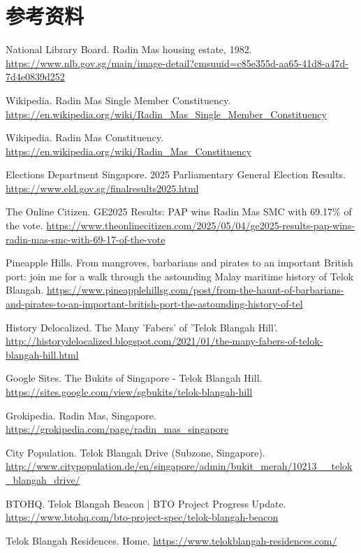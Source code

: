 \documentclass[11pt,a4paper,twoside,openany]{book}
\begin{document}
\section*{参考资料}
\begin{enumerate}[label={[\arabic*]},leftmargin=*,topsep=2pt,itemsep=1pt,parsep=0pt]
  \item National Library Board. Radin Mas housing estate, 1982. \url{https://www.nlb.gov.sg/main/image-detail?cmsuuid=c85e355d-aa65-41d8-a47d-7d4e0839d252}
  \item Wikipedia. Radin Mas Single Member Constituency. \url{https://en.wikipedia.org/wiki/Radin_Mas_Single_Member_Constituency}
  \item Wikipedia. Radin Mas Constituency. \url{https://en.wikipedia.org/wiki/Radin_Mas_Constituency}
  \item Elections Department Singapore. 2025 Parliamentary General Election Results. \url{https://www.eld.gov.sg/finalresults2025.html}
  \item The Online Citizen. GE2025 Results: PAP wins Radin Mas SMC with 69.17\% of the vote. \url{https://www.theonlinecitizen.com/2025/05/04/ge2025-results-pap-wins-radin-mas-smc-with-69-17-of-the-vote}
  \item Pineapple Hills. From mangroves, barbarians and pirates to an important British port: join me for a walk through the astounding Malay maritime history of Telok Blangah. \url{https://www.pineapplehillsg.com/post/from-the-haunt-of-barbarians-and-pirates-to-an-important-british-port-the-astounding-history-of-tel}
  \item History Delocalized. The Many 'Fabers' of 'Telok Blangah Hill'. \url{http://historydelocalized.blogspot.com/2021/01/the-many-fabers-of-telok-blangah-hill.html}
  \item Google Sites. The Bukits of Singapore - Telok Blangah Hill. \url{https://sites.google.com/view/sgbukits/telok-blangah-hill}
  \item Grokipedia. Radin Mas, Singapore. \url{https://grokipedia.com/page/radin_mas_singapore}
  \item City Population. Telok Blangah Drive (Subzone, Singapore). \url{http://www.citypopulation.de/en/singapore/admin/bukit_merah/10213__telok_blangah_drive/}
  \item BTOHQ. Telok Blangah Beacon | BTO Project Progress Update. \url{https://www.btohq.com/bto-project-spec/telok-blangah-beacon}
  \item Telok Blangah Residences. Home. \url{https://www.telokblangah-residences.com/}

\end{enumerate}
\end{document}
